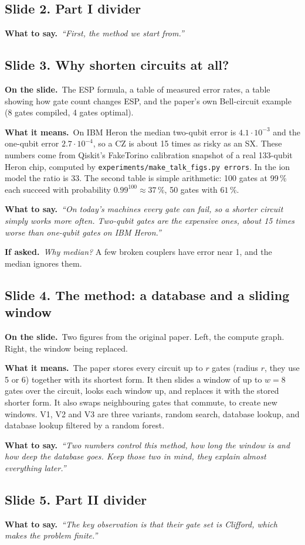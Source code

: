 \documentclass[11pt,a4paper]{article}
\newcommand{\say}[1]{\emph{``#1''}}
\newcommand{\slide}[2]{\subsection*{Slide #1. #2}}
\newcommand{\shows}{\par\textbf{\color{ibar}On the slide.}\ }
\newcommand{\means}{\par\textbf{\color{ibar}What it means.}\ }
\newcommand{\tosay}{\par\textbf{\color{ibar}What to say.}\ }
\newcommand{\ifasked}{\par\textbf{\color{ibar}If asked.}\ }
\begin{document}
\slide{2}{Part I divider}
\tosay \say{First, the method we start from.}

\slide{3}{Why shorten circuits at all?}
\shows The ESP formula, a table of measured error rates, a table showing how gate count changes ESP, and the paper's own
Bell-circuit example (8 gates compiled, 4 gates optimal).
\means On IBM Heron the median two-qubit error is $4.1\cdot10^{-3}$ and the one-qubit error $2.7\cdot10^{-4}$, so a CZ
is about 15 times as risky as an SX. These numbers come from Qiskit's FakeTorino calibration snapshot of a real
133-qubit Heron chip, computed by \texttt{experiments/make\_talk\_figs.py errors}. In the ion model the ratio is 33. The
second table is simple arithmetic: 100 gates at 99\,\% each succeed with probability $0.99^{100}\approx37\,\%$, 50 gates
with $61\,\%$.
\tosay \say{On today's machines every gate can fail, so a shorter circuit simply works more often. Two-qubit gates are
the expensive ones, about 15 times worse than one-qubit gates on IBM Heron.}
\ifasked \emph{Why median?} A few broken couplers have error near 1, and the median ignores them.

\slide{4}{The method: a database and a sliding window}
\shows Two figures from the original paper. Left, the compute graph. Right, the window being replaced.
\means The paper stores every circuit up to $r$ gates (radius $r$, they use 5 or 6) together with its shortest form. It
then slides a window of up to $w=8$ gates over the circuit, looks each window up, and replaces it with the stored
shorter form. It also swaps neighbouring gates that commute, to create new windows. V1, V2 and V3 are three variants,
random search, database lookup, and database lookup filtered by a random forest.
\tosay \say{Two numbers control this method, how long the window is and how deep the database goes. Keep those two in
mind, they explain almost everything later.}

\slide{5}{Part II divider}
\tosay \say{The key observation is that their gate set is Clifford, which makes the problem finite.}
\end{document}
